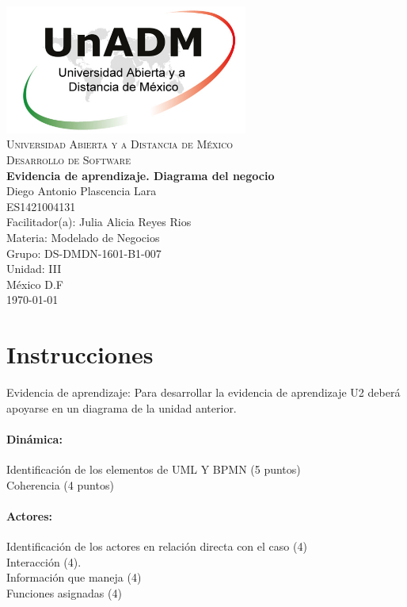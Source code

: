 \documentclass[spanish,12pt,letterpapper]{article}
\begin{document}
	\begin{titlepage}
		\begin{center}
			\includegraphics[width=0.6\textwidth]{../logoUnADM}~\\[1cm] 
			\textsc{Universidad Abierta y a Distancia de México}\\[0.8cm]
			\textsc{Desarrollo de Software}\\[1.8cm]
			
			\textbf{ \Large Evidencia de aprendizaje. Diagrama del negocio }\\[3cm]
			
			Diego Antonio Plascencia Lara\\ ES1421004131 \\[0.4cm]
			Facilitador(a): Julia Alicia Reyes Rios\\
			Materia: Modelado de Negocios\\
			Grupo: DS-DMDN-1601-B1-007 \\
			Unidad: III \\
			
			\vfill México D.F\\{\today}
			
		\end{center}
	\end{titlepage}
	
	\section{Instrucciones}	
	Evidencia de aprendizaje: Para desarrollar la evidencia de aprendizaje U2 deberá apoyarse en un diagrama de la unidad anterior.\\
	\paragraph{Dinámica:\\}	
Identificación de los elementos de UML Y BPMN (5 puntos)\\
Coherencia (4 puntos)\\
\paragraph{Actores:\\}
Identificación de los actores en relación directa con el caso (4)\\
Interacción (4).\\
Información que maneja (4)\\
Funciones asignadas (4)\\
\end{document}
